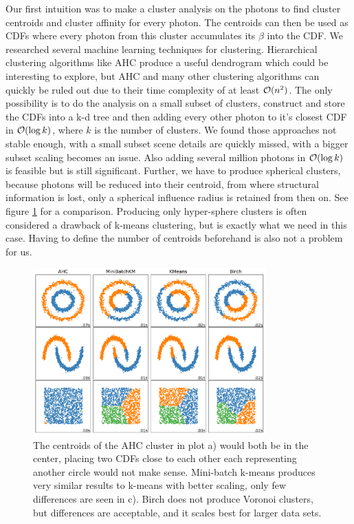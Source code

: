 Our first intuition was to make a cluster analysis on the photons to find cluster centroids and cluster affinity for every photon. The centroids can then be used as CDFs where every photon from this cluster accumulates its $\beta$ into the CDF. We researched several machine learning techniques for clustering. Hierarchical clustering algorithms like AHC produce a useful dendrogram which could be interesting to explore, but AHC and many other clustering algorithms can quickly be ruled out due to their time complexity of at least $\mathcal{O}(n^2)$. The only possibility is to do the analysis on a small subset of clusters, construct and store the CDFs into a k-d tree and then adding every other photon to it's closest CDF in $\mathcal{O}(\log k)$, where $k$ is the number of clusters. We found those approaches not stable enough, with a small subset scene details are quickly missed, with a bigger subset scaling becomes an issue. Also adding several million photons in $\mathcal{O}(\log k)$ is feasible but is still significant. Further, we have to produce spherical clusters, because photons will be reduced into their centroid, from where structural information is lost, only a spherical influence radius is retained from then on. See figure \ref{fig:clustering} for a comparison. Producing only hyper-sphere clusters is often considered a drawback of k-means clustering, but is exactly what we need in this case. Having to define the number of centroids beforehand is also not a problem for us.

\begin{figure}
    \centering
    \includegraphics[width=0.8\textwidth]{figures/plots/mlclustering.pdf}
    \caption{The centroids of the AHC cluster in plot a) would both be in the center, placing two CDFs close to each other each representing another circle would not make sense. Mini-batch k-means produces very similar results to k-means with better scaling, only few differences are seen in c). Birch does not produce Voronoi clusters, but differences are acceptable, and it scales best for larger data sets.}
    \label{fig:clustering}
\end{figure}
    
